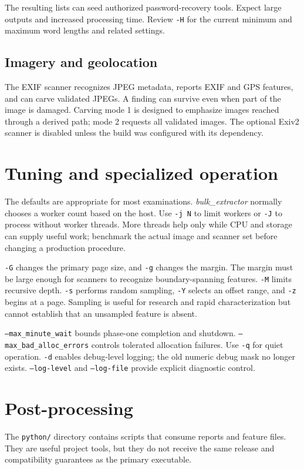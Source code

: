 \documentclass[11pt]{article}
\newcommand{\bulk}{\textit{bulk\_extractor}\xspace}
\newcommand{\code}[1]{\texttt{#1}}
\begin{document}
The resulting lists can seed authorized password-recovery tools. Expect large
outputs and increased processing time. Review \code{-H} for the current minimum
and maximum word lengths and related settings.

\subsection{Imagery and geolocation}

The EXIF scanner recognizes JPEG metadata, reports EXIF and GPS features, and
can carve validated JPEGs. A finding can survive even when part of the image is
damaged. Carving mode 1 is designed to emphasize images reached through a
derived path; mode 2 requests all validated images. The optional Exiv2 scanner
is disabled unless the build was configured with its dependency.

\section{Tuning and specialized operation}

The defaults are appropriate for most examinations. \bulk normally chooses a
worker count based on the host. Use \code{-j N} to limit workers or \code{-J}
to process without worker threads. More threads help only while CPU and storage
can supply useful work; benchmark the actual image and scanner set before
changing a production procedure.

\code{-G} changes the primary page size, and \code{-g} changes the margin.
The margin must be large enough for scanners to recognize boundary-spanning
features. \code{-M} limits recursive depth. \code{-s} performs random
sampling, \code{-Y} selects an offset range, and \code{-z} begins at a page.
Sampling is useful for research and rapid characterization but cannot establish
that an unsampled feature is absent.

\code{--max\_minute\_wait} bounds phase-one completion and shutdown.
\code{--max\_bad\_alloc\_errors} controls tolerated allocation failures.
Use \code{-q} for quiet operation. \code{-d} enables debug-level logging; the
old numeric debug mask no longer exists. \code{--log-level} and
\code{--log-file} provide explicit diagnostic control.

\section{Post-processing}

The \code{python/} directory contains scripts that consume reports and feature
files. They are useful project tools, but they do not receive the same release
and compatibility guarantees as the primary executable.
\end{document}
